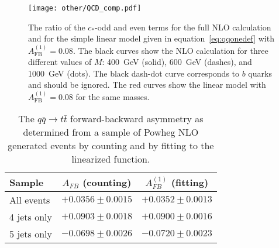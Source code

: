 \documentclass{cmspaperpdf}
\begin{document}
\begin{figure}[hbt]
  \begin{center}
    \texttt{[image: other/QCD\_comp.pdf]}
  \caption{\small The ratio of the $c_*$-odd and even terms for the full NLO calculation and for the simple linear model given in equation~\ref{eq:qqonedef} with $A_\mathrm{FB}^{(1)} = 0.08$.  The black curves show the NLO calculation for three different values of $M$: 400~GeV (solid), 600~GeV (dashes), and 1000~GeV (dots).  The black dash-dot curve corresponds to $b$ quarks and should be ignored.  The red curves show the linear model with $A_\mathrm{FB}^{(1)} = 0.08$ for the same masses.}
    \label{fig:qcd_comp}
  \end{center}
\end{figure}

\begin{table}[hbt]
\begin{center}
\caption{\small \label{tab:afb_counting_fitting} The $q\bar q\to t\bar t$ forward-backward asymmetry as determined from a sample of Powheg NLO generated events by counting and by fitting to the linearized function.}
\vspace{3pt}
\begin{tabular}{|l|cc|}\hline
 Sample      & $A_{FB}$ (counting) & $A_{FB}^{(1)}$ (fitting) \\ \hline
All events   & $+0.0356\pm0.0015$  & $+0.0352\pm0.0013$       \\ 
4 jets only  & $+0.0903\pm0.0018$  & $+0.0900\pm0.0016$       \\ 
5 jets only  & $-0.0698\pm0.0026$  & $-0.0720\pm0.0023$       \\ 
\hline
\end{tabular}
\end{center}
\end{table}
\end{document}
